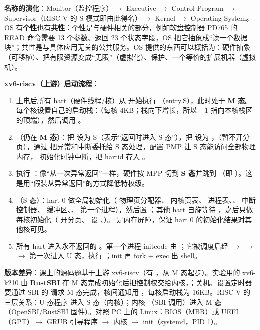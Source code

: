 \textbf{名称的演化}：Monitor（监控程序）$\to$ Executive $\to$ Control Program $\to$ Supervisor（RISC-V 的 S 模式即由此得名）$\to$ Kernel $\to$ Operating System。OS 有\textbf{个性}也有\textbf{共性}：个性是与硬件相关的部分，例如软盘控制器 PD765 的 READ 命令需要 13 个参数、返回 23 个状态字段，OS 把它抽象成“读一个数据块”；共性是与具体应用无关的公共服务。OS 提供的东西可以概括为：硬件抽象（可移植）、把有限资源变成“无限”（虚拟化）、保护、一个等价的扩展机器（虚拟机）。

\textbf{xv6-riscv（上游）启动流程}：
\begin{enumerate}
    \item 上电后所有 hart（硬件线程/核）从  开始执行 （entry.S），此时处于 \textbf{M 态}。每个核设置自己的启动栈：（每核 4KB；栈向下增长，所以 $+1$ 指向本核栈区的顶端），然后调用 。
    \item {}（仍在 \textbf{M 态}）：把  设为 S（表示“返回时进入 S 态”），把  设为 ，（暂不开分页），通过  把异常和中断委托给 S 态处理，配置 PMP 让 S 态能访问全部物理内存， 初始化时钟中断，把 hartid 存入 。
    \item 执行 ：像“从一次异常返回”一样，硬件按 MPP 切到 \textbf{S 态}并跳到 （即 ）。这是用“假装从异常返回”的方式降低特权级。
    \item {}（S 态）：hart 0 做全局初始化（ 物理页分配器、 内核页表、 进程表、、 中断控制器、 缓冲区、、 第一个进程），然后置 ；其他 hart 自旋等待 ，之后只做每核初始化（ 开分页、 设 、）。 是内存屏障，保证 hart 0 的初始化结果对其他核可见。
    \item 所有 hart 进入永不返回的 。第一个进程 initcode 由  ；它被调度后经  $\to$  $\to$  $\to$  第一次进入 U 态，执行 ；init 再 fork + exec 出 shell。
\end{enumerate}

\textbf{版本差异}：课上的源码题基于上游 xv6-riscv（有 ，从 M 态起步）。实验用的 xv6-k210 由 \textbf{RustSBI} 在 M 态完成初始化后把控制权交给内核，；关机、设置定时器要通过 SBI 的  请求 M 态完成，核间通知用 ，每核启动栈为 16KB。RISC-V 的三层关系：U 态程序  进入 S 态（内核）；内核 （SBI 调用）进入 M 态（OpenSBI/RustSBI 固件）。对照 PC 上的 Linux：BIOS（MBR）或 UEFI（GPT）$\to$ GRUB 引导程序 $\to$ 内核 $\to$ init（systemd，PID 1）。

